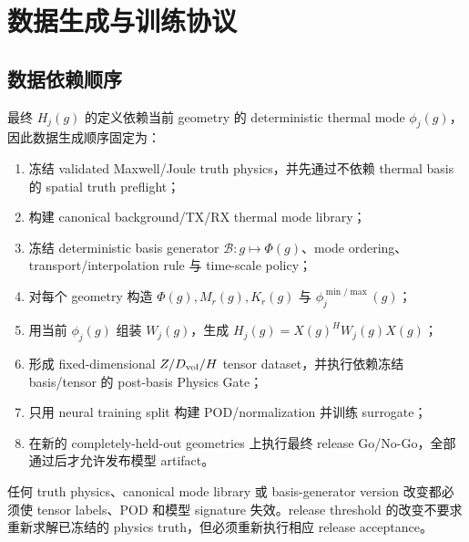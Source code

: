 \section{数据生成与训练协议}

\subsection{数据依赖顺序}
最终 $H_j(g)$ 的定义依赖当前 geometry 的 deterministic thermal mode $\phi_j(g)$，因此数据生成顺序固定为：
\begin{enumerate}
  \item 冻结 validated Maxwell/Joule truth physics，并先通过不依赖 thermal basis 的 spatial truth preflight；
  \item 构建 canonical background/TX/RX thermal mode library；
  \item 冻结 deterministic basis generator $\mathcal B:g\mapsto\Phi(g)$、mode ordering、transport/interpolation rule 与 time-scale policy；
  \item 对每个 geometry 构造 $\Phi(g),M_r(g),K_r(g)$ 与 $\phi_j^{\min/\max}(g)$；
  \item 用当前 $\phi_j(g)$ 组装 $W_j(g)$，生成 $H_j(g)=X(g)^HW_j(g)X(g)$；
  \item 形成 fixed-dimensional $Z/D_{\rm vol}/H$ tensor dataset，并执行依赖冻结 basis/tensor 的 post-basis Physics Gate；
  \item 只用 neural training split 构建 POD/normalization 并训练 surrogate；
  \item 在新的 completely-held-out geometries 上执行最终 release Go/No-Go，全部通过后才允许发布模型 artifact。
\end{enumerate}
任何 truth physics、canonical mode library 或 basis-generator version 改变都必须使 tensor labels、POD 和模型 signature 失效。release threshold 的改变不要求重新求解已冻结的 physics truth，但必须重新执行相应 release acceptance。

